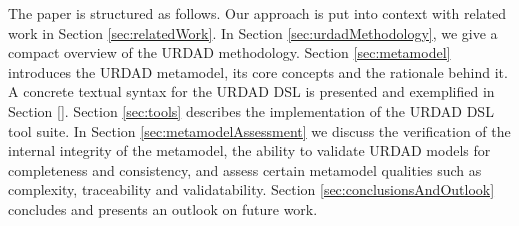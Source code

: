 The paper is structured as follows. Our approach is put into context with related work in Section \ref{sec:relatedWork}. In Section \ref{sec:urdadMethodology}, we give a compact overview of the URDAD methodology. Section \ref{sec:metamodel} introduces the URDAD metamodel, its core concepts and the rationale behind it. A concrete textual syntax for the URDAD DSL is presented and exemplified in Section \ref{}. Section \ref{sec:tools} describes the implementation of the URDAD DSL tool suite. In Section \ref{sec:metamodelAssessment} we discuss the verification of the internal integrity of the metamodel, the ability to validate URDAD models for completeness and consistency, and assess certain metamodel qualities such as complexity, traceability and validatability. Section \ref{sec:conclusionsAndOutlook} concludes and presents an outlook on future work.
